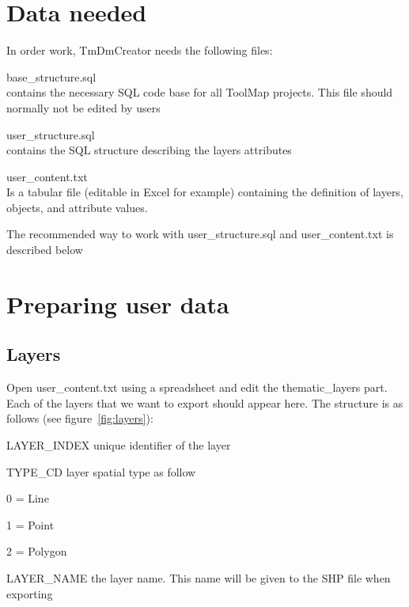 \documentclass[a4paper, 12pt]{article}
\begin{document}
\section{Data needed}
In order work, TmDmCreator needs the following files:
    \begin{description*}
  \item[base\_structure.sql]\hfill \\ contains the necessary SQL code base for all ToolMap projects. This file should normally not be edited by users
  \item[user\_structure.sql]\hfill \\ contains the SQL structure describing the layers attributes
  \item[user\_content.txt]\hfill \\ Is a tabular file (editable in Excel for example) containing the definition of layers, objects, and attribute values.
\end{description*}
The recommended way to work with user\_structure.sql and user\_content.txt is described below

\clearpage
\section{Preparing user data}

\subsection{Layers}
Open user\_content.txt using a spreadsheet and edit the thematic\_layers part. Each of the layers that we want to export should appear here. The structure is as follows (see figure~\ref{fig:layers}):
\begin{description*}
  \item [LAYER\_INDEX] unique identifier of the layer
  \item [TYPE\_CD] layer spatial type as follow
    \begin{description*}
      \item [0] = Line
      \item [1] = Point
      \item [2] = Polygon
    \end{description*}
  \item [LAYER\_NAME] the layer name. This name will be given to the SHP file when exporting
\end{description*}
\end{document}
